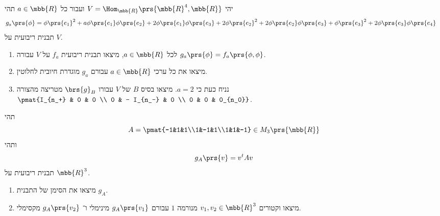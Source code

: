 \documentclass[a4paper,10pt,twoside,openany]{article}
\begin{document}
\begin{exercise}[רשות]
יהי
$V = \Hom_{\mbb{R}}\prs{\mbb{R}^4, \mbb{R}}$
ועבור כל
$a \in \mbb{R}$
תהי
\begin{align*}
    g_a\prs{\phi} &= \phi\prs{e_1}^2 + a\phi\prs{e_1}\phi\prs{e_2} + 2\phi\prs{e_1}\phi\prs{e_3} + 2\phi\prs{e_2}^2 + 2 \phi\prs{e_2}\phi\prs{e_3} + \phi\prs{e_3}^2 + 2 \phi\prs{e_3} \phi\prs{e_4} 
\end{align*}
תבנית ריבועית על
$V$.

\begin{enumerate}
    \item 
    לכל
    $a \in \mbb{R}$,
    מיצאו תבנית ריבועית
    $f_a$
    על
    $V$
    עבורה
    $g_a\prs{\phi} = f_a\prs{\phi, \phi}$.
    
    \item מיצאו את כל ערכי
    $a \in \mbb{R}$
    עבורם
    $g_a$
    מוגדרת חיובית לחלוטין.
    
    \item
    נניח כעת כי
    $a = 2$.
    מיצאו בסיס
    $B$
    של
    $V$
    עבורו
    $\brs{g}_B$
    מטריצה מהצורה
    $\pmat{I_{n_+} & 0 & 0 \\ 0 & - I_{n_-} & 0 \\ 0 & 0 & 0_{n_0}}$.
\end{enumerate}
\end{exercise}

\begin{exercise}[רשות]
תהי
\[A = \pmat{-1&1&1\\1&-1&1\\1&1&-1} \in M_3\prs{\mbb{R}}\]
ותהי
\[g_A\prs{v} = v^t A v\]
תבנית ריבועית על
$\mbb{R}^3$.

\begin{enumerate}
    \item מיצאו את הסימן של התבנית
    $g_A$.
    
    \item מיצאו וקטורים
    $v_1, v_2 \in \mbb{R}^3$
    מנורמה
    $1$
    עבורם
    $g_A\prs{v_1}$
    מינימלי ו־%
    $g_A\prs{v_2}$
    מקסימלי.
\end{enumerate}
\end{exercise}
\end{document}
